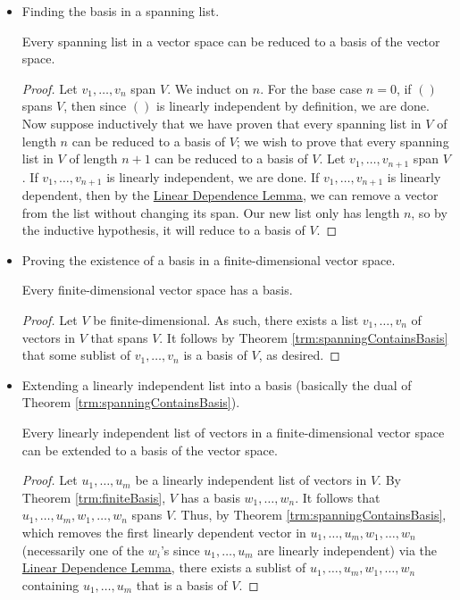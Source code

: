 \documentclass[../main.tex]{subfiles}
\begin{document}
\begin{itemize}
\begin{theorem}
\begin{proof}
        \end{proof}
    \end{theorem}
    \item Finding the basis in a spanning list.
    \begin{theorem}\label{trm:spanningContainsBasis}
        Every spanning list in a vector space can be reduced to a basis of the vector space.
        \begin{proof}
            Let $v_1,\dots,v_n$ span $V$. We induct on $n$. For the base case $n=0$, if $()$ spans $V$, then since $()$ is linearly independent by definition, we are done. Now suppose inductively that we have proven that every spanning list in $V$ of length $n$ can be reduced to a basis of $V$; we wish to prove that every spanning list in $V$ of length $n+1$ can be reduced to a basis of $V$. Let $v_1,\dots,v_{n+1}$ span $V$. If $v_1,\dots,v_{n+1}$ is linearly independent, we are done. If $v_1,\dots,v_{n+1}$ is linearly dependent, then by the \hyperref[lem:linearDependenceLemma]{Linear Dependence Lemma}, we can remove a vector from the list without changing its span. Our new list only has length $n$, so by the inductive hypothesis, it will reduce to a basis of $V$.
        \end{proof}
    \end{theorem}
    \item Proving the existence of a basis in a finite-dimensional vector space.
    \begin{theorem}\label{trm:finiteBasis}
        Every finite-dimensional vector space has a basis.
        \begin{proof}
            Let $V$ be finite-dimensional. As such, there exists a list $v_1,\dots,v_n$ of vectors in $V$ that spans $V$. It follows by Theorem \ref{trm:spanningContainsBasis} that some sublist of $v_1,\dots,v_n$ is a basis of $V$, as desired.
        \end{proof}
    \end{theorem}
    \item Extending a linearly independent list into a basis (basically the dual of Theorem \ref{trm:spanningContainsBasis}).
    \begin{theorem}\label{trm:lnlIndependentExtendBasis}
        Every linearly independent list of vectors in a finite-dimensional vector space can be extended to a basis of the vector space.
        \begin{proof}
            Let $u_1,\dots,u_m$ be a linearly independent list of vectors in $V$. By Theorem \ref{trm:finiteBasis}, $V$ has a basis $w_1,\dots,w_n$. It follows that $u_1,\dots,u_m,w_1,\dots,w_n$ spans $V$. Thus, by Theorem \ref{trm:spanningContainsBasis}, which removes the first linearly dependent vector in $u_1,\dots,u_m,w_1,\dots,w_n$ (necessarily one of the $w_i$'s since $u_1,\dots,u_m$ are linearly independent) via the \hyperref[lem:linearDependenceLemma]{Linear Dependence Lemma}, there exists a sublist of $u_1,\dots,u_m,w_1,\dots,w_n$ containing $u_1,\dots,u_m$ that is a basis of $V$.

\end{proof}
\end{theorem}
\end{itemize}
\end{document}
